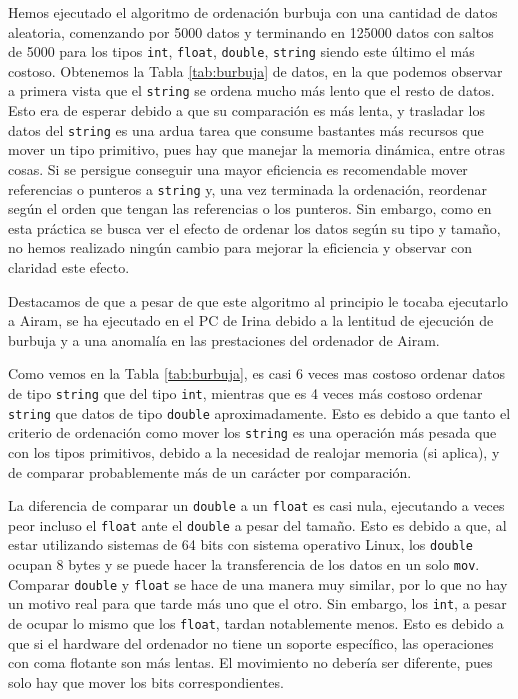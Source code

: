 \documentclass[12pt]{article}
\begin{document}
    Hemos ejecutado el algoritmo de ordenación burbuja con una cantidad de datos aleatoria,  comenzando por 5000 datos y terminando en 125000 datos con saltos de 5000 para los tipos \verb|int|, \verb|float|, \verb|double|, \verb|string| siendo este último el más costoso.  
    Obtenemos la Tabla \ref{tab:burbuja} de datos, en la que podemos observar a primera vista que el \verb|string| se ordena mucho más lento que el resto de datos. Esto era de esperar debido a que su comparación es más lenta, y trasladar los datos del \verb|string| es una ardua tarea que consume bastantes más recursos que mover un tipo primitivo, pues hay que manejar la memoria dinámica, entre otras cosas. Si se persigue conseguir una mayor eficiencia es recomendable mover referencias o punteros a \verb|string| y, una vez terminada la ordenación, reordenar según el orden que tengan las referencias o los punteros. Sin embargo, como en esta práctica se busca ver el efecto de ordenar los datos según su tipo y tamaño, no hemos realizado ningún cambio para mejorar la eficiencia y observar con claridad este efecto.

    Destacamos de que a pesar de que este algoritmo al principio le tocaba ejecutarlo a Airam, se ha ejecutado en el PC de Irina debido a la lentitud de ejecución de burbuja y a una anomalía en las prestaciones del ordenador de Airam.
    
    Como vemos en la Tabla \ref{tab:burbuja}, es casi 6 veces mas costoso ordenar datos de tipo \verb|string| que del tipo \verb|int|, mientras que es 4 veces más costoso ordenar \verb|string| que datos de tipo \verb|double| aproximadamente. Esto es debido a que tanto el criterio de ordenación como mover los \verb|string| es una operación más pesada que con los tipos primitivos, debido a la necesidad de realojar memoria (si aplica), y de comparar probablemente más de un carácter por comparación. 

    La diferencia de comparar un \verb|double| a un \verb|float| es casi nula, ejecutando a veces peor incluso el \verb|float| ante el \verb|double| a pesar del tamaño. Esto es debido a que, al estar utilizando sistemas de 64 bits con sistema operativo Linux, los \verb|double| ocupan 8 bytes y se puede hacer la transferencia de los datos en un solo \verb|mov|. Comparar \verb|double| y \verb|float| se hace de una manera muy similar, por lo que no hay un motivo real para que tarde más uno que el otro. Sin embargo, los \verb|int|, a pesar de ocupar lo mismo que los \verb|float|, tardan notablemente menos. Esto es debido a que si el hardware del ordenador no tiene un soporte específico, las operaciones con coma flotante son más lentas. El movimiento no debería ser diferente, pues solo hay que mover los bits correspondientes.
    
\end{document}
